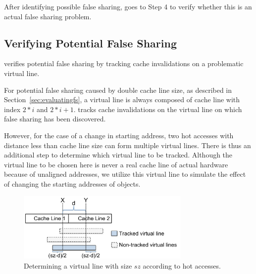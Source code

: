   
After identifying possible false sharing, \Predator{} goes to Step 4 to 
verify whether this is an actual false sharing problem.

\subsection{Verifying Potential False Sharing}
\label{sec:tracking}

\Predator{} verifies potential false sharing by tracking 
cache invalidations on a problematic virtual line.

For potential false sharing caused by double cache line size, as described in
Section~\ref{sec:evaluatingfs}, a virtual line is always composed of 
cache line with index $2*i$ and $2*i+1$. 
\Predator{} tracks cache invalidations
on the virtual line on which false sharing has been discovered.

However, for the case of a change in starting address,
two hot accesses with distance less than cache line size 
can form multiple virtual lines. 
There is thus an additional step to determine which virtual line to be tracked.
Although the virtual line to be chosen here is never a real cache line of actual hardware
because of unaligned addresses,
we utilize this virtual line to simulate the effect of changing the 
starting addresses of objects.


\begin{figure}
\begin{center} 
\includegraphics[width=3.3in]{fig/trackpotential}
\end{center}
\caption{Determining a virtual line with size $sz$ according to hot accesses.}
\label{fig:trackpotential}
\end{figure}

